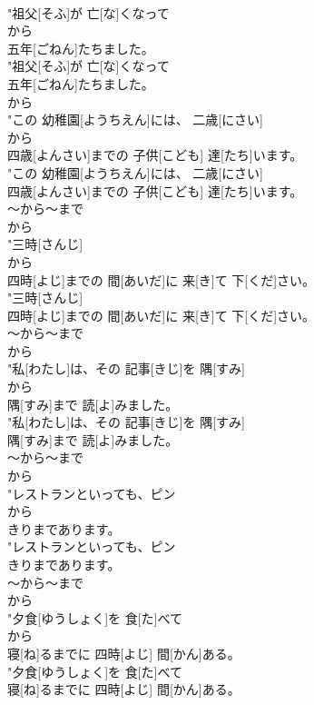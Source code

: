 \documentclass[8pt]{extreport}
\begin{document}
\begin{CJK}{UTF8}{min}
\\	"祖父[そふ]が 亡[な]くなって
\\	から
\\	五年[ごねん]たちました。
\\	"祖父[そふ]が 亡[な]くなって
\\	五年[ごねん]たちました。
\\	から
\\	"この 幼稚園[ようちえん]には、 二歳[にさい]
\\	から
\\	四歳[よんさい]までの 子供[こども] 達[たち]います。
\\	"この 幼稚園[ようちえん]には、 二歳[にさい]
\\	四歳[よんさい]までの 子供[こども] 達[たち]います。
\\	～から～まで 
\\	から
\\	"三時[さんじ]
\\	から
\\	四時[よじ]までの 間[あいだ]に 来[き]て 下[くだ]さい。
\\	"三時[さんじ]
\\	四時[よじ]までの 間[あいだ]に 来[き]て 下[くだ]さい。
\\	～から～まで 
\\	から
\\	"私[わたし]は、その 記事[きじ]を 隅[すみ]
\\	から
\\	隅[すみ]まで 読[よ]みました。
\\	"私[わたし]は、その 記事[きじ]を 隅[すみ]
\\	隅[すみ]まで 読[よ]みました。
\\	～から～まで 
\\	から
\\	"レストランといっても、ピン
\\	から
\\	きりまであります。
\\	"レストランといっても、ピン
\\	きりまであります。
\\	～から～まで 
\\	から
\\	"夕食[ゆうしょく]を 食[た]べて
\\	から
\\	寝[ね]るまでに 四時[よじ] 間[かん]ある。
\\	"夕食[ゆうしょく]を 食[た]べて
\\	寝[ね]るまでに 四時[よじ] 間[かん]ある。

\end{CJK}
\end{document}
